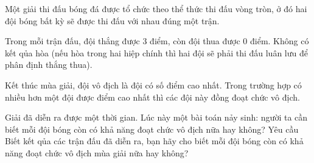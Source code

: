 Một giải thi đấu bóng đá được tổ chức theo thể thức thi đấu vòng tròn, ở đó hai đội bóng bất kỳ sẽ được thi đấu với nhau đúng một trận.  

   Trong mỗi trận đấu, đội thắng được 3 điểm, còn đội thua được 0 điểm. Không có kết qủa hòa (nếu hòa trong hai hiệp chính thì hai đội sẽ phải thi đấu luân lưu để phân định thắng thua).  

   Kết thúc mùa giải, đội vô địch là đội có số điểm cao nhất. Trong trường hợp có nhiều hơn một đội được điểm cao nhất thì các đội này đồng đoạt chức vô địch.  

   Giải đã diễn ra được một thời gian. Lúc này một bài toán nảy sinh: người ta cần biết mỗi đội bóng còn có khả năng đoạt chức vô địch nữa hay không?
   Yêu cầu  
Biết kết qủa các trận đấu đã diễn ra, bạn hãy cho biết mỗi đội bóng còn có khả năng đoạt chức vô địch mùa giải nữa hay không?